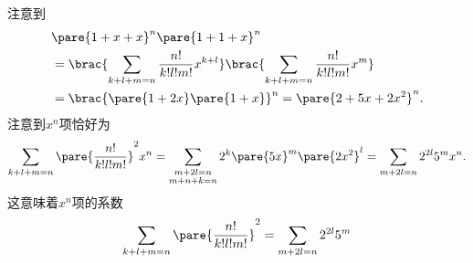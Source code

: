 \documentclass[hidelinks]{ctexart}
\begin{document}
注意到
\begin{align*}
    & \pare{1+x+x}^n\pare{1+1+x}^n \\
    & = \brac{\sum_{k+l+m = n}\frac{n!}{k!l!m!}x^{k+l}}\brac{\sum_{k+l+m=n}\frac{n!}{k!l!m!}x^m} \\
    & = \brac{\pare{1+2x}\pare{1+x}}^n = \pare{2+5x+2x^2}^n.
\end{align*}
注意到$x^n$项恰好为
\[ \sum_{k+l+m=n} \pare{\frac{n!}{k!l!m!}}^2 x^n = \sum_{\substack{m+2l=n\\ m+n+k=n}} 2^k\pare{5x}^m \pare{2x^2}^l = \sum_{m+2l=n} 2^{2l}5^m x^n. \]
这意味着$x^n$项的系数
\[ \sum_{k+l+m=n} \pare{\frac{n!}{k!l!m!}}^2 = \sum_{m+2l=n} 2^{2l}5^m \]
\end{document}
